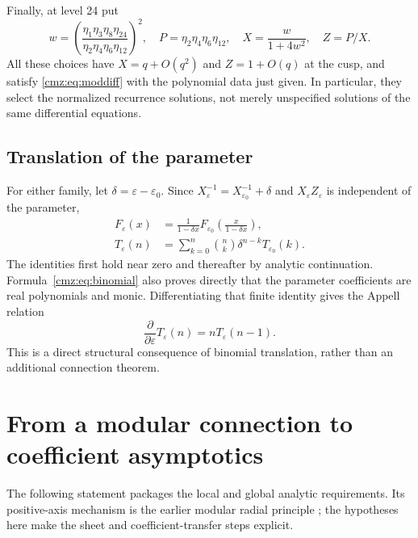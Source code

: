 \documentclass[11pt,letterpaper]{article}
\numberwithin{equation}{section}
\theoremstyle{definition}\newtheorem{definition}[theorem]{Definition}
\theoremstyle{remark}\newtheorem{remark}[theorem]{Remark}
\newcommand{\eps}{\varepsilon}
\begin{document}
Finally, at level 24 put
\begin{equation}
w=\left(\frac{\eta_1\eta_3\eta_8\eta_{24}}
                  {\eta_2\eta_4\eta_6\eta_{12}}\right)^2,\quad
P=\eta_2\eta_4\eta_6\eta_{12},\quad X=\frac{w}{1+4w^2},\quad Z=P/X.
\label{cmz:eq:24mod}
\end{equation}
All these choices have $X=q+O(q^2)$ and $Z=1+O(q)$ at the cusp, and satisfy \eqref{cmz:eq:moddiff} with the polynomial data just given. In particular, they select the normalized recurrence solutions, not merely unspecified solutions of the same differential equations.

\subsection{Translation of the parameter}
For either family, let $\delta=\eps-\eps_0$. Since $X_\eps^{-1}=X_{\eps_0}^{-1}+\delta$ and $X_\eps Z_\eps$ is independent of the parameter,
\begin{align}
F_\eps(x)&=\frac1{1-\delta x}
 F_{\eps_0}\!\left(\frac{x}{1-\delta x}\right),\label{cmz:eq:transform}\\
T_\eps(n)&=\sum_{k=0}^n\binom nk\delta^{n-k}T_{\eps_0}(k).
\label{cmz:eq:binomial}
\end{align}
The identities first hold near zero and thereafter by analytic continuation. Formula~\eqref{cmz:eq:binomial} also proves directly that the parameter coefficients are real polynomials and monic. Differentiating that finite identity gives the Appell relation
\begin{equation}
\frac{\partial}{\partial\eps}T_\eps(n)=nT_\eps(n-1).
\label{cmz:eq:appell}
\end{equation}
This is a direct structural consequence of binomial translation, rather than an additional connection theorem.

\section{From a modular connection to coefficient asymptotics}
\label{cmz:sec:connection}
The following statement packages the local and global analytic requirements. Its positive-axis mechanism is the earlier modular radial principle \cite{GZ}; the hypotheses here make the sheet and coefficient-transfer steps explicit.
\end{document}
